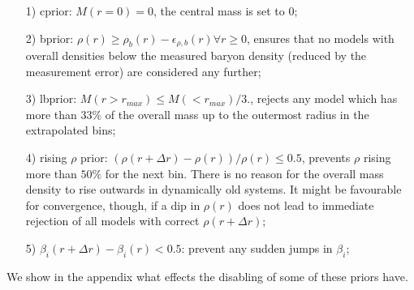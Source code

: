 \begin{enumerate}
\item[1)] cprior: $M(r=0) = 0$, the central mass is set to 0;

\item[2)] bprior: $\rho(r) \geq \rho_b(r)-\epsilon_{\rho,b}(r) \forall
  r\geq0$, ensures that no models with overall densities below the
  measured baryon density (reduced by the measurement error) are
  considered any further;

\item[3)] lbprior: $M(r>r_{max}) \leq M(<r_{max})/3.$, rejects any
  model which has more than $33\%$ of the overall mass up to the
  outermost radius in the extrapolated bins;

\item[4)] rising $\rho$ prior: $(\rho(r+\Delta r)-\rho(r))/\rho(r)\leq
  0.5$, prevents $\rho$ rising more than $50\%$ for the next
  bin. There is no reason for the overall mass density to rise
  outwards in dynamically old systems. It might be favourable for
  convergence, though, if a dip in $\rho(r)$ does not lead to
  immediate rejection of all models with correct $\rho(r+\Delta r)$;

\item[5)] $\beta_i(r+\Delta r)-\beta_i(r) < 0.5$: prevent any sudden
  jumps in $\beta_i$;
\end{enumerate}

We show in the appendix what effects the disabling of some of these
priors have.
